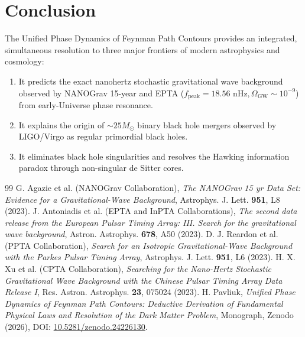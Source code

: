 \documentclass[11pt,a4paper]{article}
\begin{document}
\section{Conclusion}

The Unified Phase Dynamics of Feynman Path Contours provides an integrated, simultaneous resolution to three major frontiers of modern astrophysics and cosmology:
\begin{enumerate}
    \item It predicts the exact nanohertz stochastic gravitational wave background observed by NANOGrav 15-year and EPTA ($f_{\mathrm{peak}} = 18.56\text{ nHz}, \Omega_{\mathrm{GW}} \sim 10^{-9}$) from early-Universe phase resonance.
    \item It explains the origin of $\sim 25 M_\odot$ binary black hole mergers observed by LIGO/Virgo as regular primordial black holes.
    \item It eliminates black hole singularities and resolves the Hawking information paradox through non-singular de Sitter cores.
\end{enumerate}

\begin{thebibliography}{99}
 G. Agazie et al. (NANOGrav Collaboration), \textit{The NANOGrav 15 yr Data Set: Evidence for a Gravitational-Wave Background}, Astrophys. J. Lett. \textbf{951}, L8 (2023).
 J. Antoniadis et al. (EPTA and InPTA Collaborations), \textit{The second data release from the European Pulsar Timing Array: III. Search for the gravitational wave background}, Astron. Astrophys. \textbf{678}, A50 (2023).
 D. J. Reardon et al. (PPTA Collaboration), \textit{Search for an Isotropic Gravitational-Wave Background with the Parkes Pulsar Timing Array}, Astrophys. J. Lett. \textbf{951}, L6 (2023).
 H. X. Xu et al. (CPTA Collaboration), \textit{Searching for the Nano-Hertz Stochastic Gravitational Wave Background with the Chinese Pulsar Timing Array Data Release I}, Res. Astron. Astrophys. \textbf{23}, 075024 (2023).
 H. Pavliuk, \textit{Unified Phase Dynamics of Feynman Path Contours: Deductive Derivation of Fundamental Physical Laws and Resolution of the Dark Matter Problem}, Monograph, Zenodo (2026), DOI: \href{https://doi.org/10.5281/zenodo.24226130}{10.5281/zenodo.24226130}.
\end{thebibliography}
\end{document}
